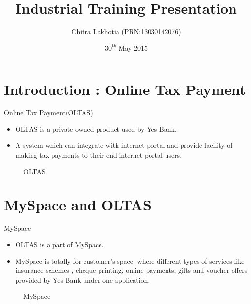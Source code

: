 \documentclass{beamer}
\title[Industrial Training:OLTAS]{Industrial Training Presentation}
\author{Chitra Lakhotia (PRN:13030142076)\\}
\institute{\bf Symbiosis Institute of Computer Studies And Research}
\date{$30^{\text{th}}$ May 2015}
\begin{document}
\begin{frame}
  \titlepage
\end{frame}


\section{Introduction : Online Tax Payment}

\begin{frame}{Online Tax Payment(OLTAS)}

\begin{itemize}
  \item OLTAS is a private owned product used by Yes Bank.
  \item A system which can integrate with internet portal and provide facility of making tax payments to their end internet portal users.
\end{itemize}

\begin{figure}
\caption{\label{fig:your-figure}OLTAS}
\end{figure}
\vskip 1cm

\end{frame}

\section{MySpace and OLTAS}

\begin{frame}{MySpace}

\begin{itemize}
  \item OLTAS is a part of MySpace.
  \item MySpace is totally for customer’s space, where different types of services like insurance schemes , cheque printing, online payments, gifts and voucher offers provided by Yes Bank under one application.

\end{itemize}

\begin{figure}
\caption{\label{fig:your-figure}MySpace}
\end{figure}
\vskip 1cm

\end{frame}
\end{document}
